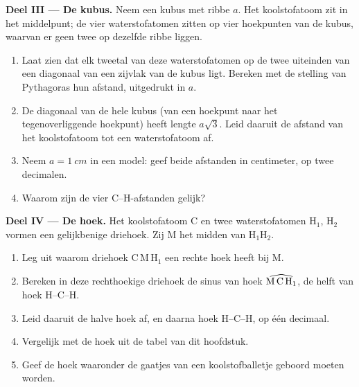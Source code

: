 \begin{problem}
\medskip
\noindent\textbf{Deel III --- De kubus.}
Neem een kubus met ribbe $a$. Het koolstofatoom zit in het middelpunt; de
vier waterstofatomen zitten op vier hoekpunten van de kubus, waarvan er
geen twee op dezelfde ribbe liggen.
\begin{enumerate}[resume]
  \item Laat zien dat elk tweetal van deze waterstofatomen op de twee
        uiteinden van een diagonaal van een zijvlak van de kubus ligt.
        Bereken met de stelling van Pythagoras hun afstand, uitgedrukt in
        $a$.
  \item De diagonaal van de hele kubus (van een hoekpunt naar het
        tegenoverliggende hoekpunt) heeft lengte $a\sqrt{3}$. Leid daaruit
        de afstand van het koolstofatoom tot een waterstofatoom af.
  \item Neem $a = \qty{1}{cm}$ in een model: geef beide afstanden in
        centimeter, op twee decimalen.
  \item Waarom zijn de vier C--H-afstanden gelijk?
\end{enumerate}

\medskip
\noindent\textbf{Deel IV --- De hoek.}
Het koolstofatoom C en twee waterstofatomen H$_1$, H$_2$ vormen een
gelijkbenige driehoek. Zij M het midden van H$_1$H$_2$.
\begin{enumerate}[resume]
  \item Leg uit waarom driehoek C\,M\,H$_1$ een rechte hoek heeft bij M.
  \item Bereken in deze rechthoekige driehoek de sinus van hoek
        $\widehat{\text{M\,C\,H}_1}$, de helft van hoek H--C--H.
  \item Leid daaruit de halve hoek af, en daarna hoek H--C--H, op één
        decimaal.
  \item Vergelijk met de hoek uit de tabel van dit hoofdstuk.
  \item Geef de hoek waaronder de gaatjes van een koolstofballetje
        geboord moeten worden.
\end{enumerate}
\end{problem}
